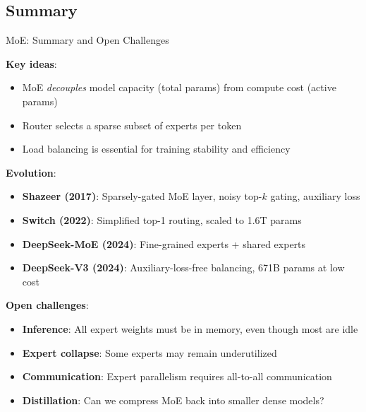 \subsection{Summary}

\begin{frame}{MoE: Summary and Open Challenges}

  \textbf{Key ideas}:
  \begin{itemize}
    \item MoE \emph{decouples} model capacity (total params) from compute cost (active params)
    \item Router selects a sparse subset of experts per token
    \item Load balancing is essential for training stability and efficiency
  \end{itemize}

  \vspace{0.5em}
  \textbf{Evolution}:
  \begin{itemize}
    \item \textbf{Shazeer (2017)}: Sparsely-gated MoE layer, noisy top-$k$ gating, auxiliary loss
    \item \textbf{Switch (2022)}: Simplified top-1 routing, scaled to 1.6T params
    \item \textbf{DeepSeek-MoE (2024)}: Fine-grained experts + shared experts
    \item \textbf{DeepSeek-V3 (2024)}: Auxiliary-loss-free balancing, 671B params at low cost
  \end{itemize}

  \vspace{0.3em}
  \textbf{Open challenges}:
  \begin{itemize}
    \item \textbf{Inference}: All expert weights must be in memory, even though most are idle
    \item \textbf{Expert collapse}: Some experts may remain underutilized
    \item \textbf{Communication}: Expert parallelism requires all-to-all communication
    \item \textbf{Distillation}: Can we compress MoE back into smaller dense models?
  \end{itemize}
\end{frame}
